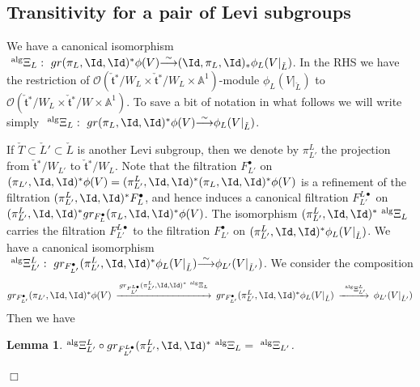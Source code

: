 \documentclass[11pt]{amsart}
\newtheorem{lem}{Lemma}
\theoremstyle{definition}
\theoremstyle{remark}
\renewcommand{\O}{{\mathcal O}}
\theoremstyle{remark}
\newcommand{\cal}{\mathcal}
\newcommand{\iso}{{\stackrel{\sim}{\longrightarrow}}}
\newcommand{\<}{\langle}
\renewcommand{\>}{\rangle}
\newcommand{\Lt}{\check{\mathfrak t}{}}
\newcommand{\LL}{\check{L}{}}
\newcommand{\LT}{\check{T}{}}
\renewcommand{\O}{{\cal O}}
\newcommand{\Aone}{{\mathbb A}^1}
\begin{document}
\subsection{Transitivity for a pair of Levi subgroups}
\label{algpair}
We have a canonical isomorphism
$\ ^{\operatorname{alg}}\Xi_L:\ gr(\pi_L,\Id,\Id)^*\phi(V)
\iso(\Id,\pi_L,\Id)_*\phi_L(V|_{\LL})$. 
In the RHS we have the restriction of 
$\O(\Lt^*/W_L\times\Lt^*/W_L\times\Aone)$-module $\phi_L(V|_{\LL})$ to
$\O(\Lt^*/W_L\times\Lt^*/W\times\Aone)$. To save a bit of notation in what 
follows we will write simply
$\ ^{\operatorname{alg}}\Xi_L:\ gr(\pi_L,\Id,\Id)^*\phi(V)\iso\phi_L(V|_{\LL})$.

If $\LT\subset\LL'\subset\LL$
is another Levi subgroup, then we denote by $\pi_{L'}^L$ the projection
from $\Lt^*/W_{L'}$ to $\Lt^*/W_L$. Note that the filtration $F_{L'}^\bullet$
on $(\pi_{L'},\Id,\Id)^*\phi(V)=
(\pi_{L'}^L,\Id,\Id)^*(\pi_L,\Id,\Id)^*\phi(V)$
is a refinement of the filtration $(\pi_{L'}^L,\Id,\Id)^*F_L^\bullet$,
and hence induces a canonical filtration $F_{L'}^{L\bullet}$ on
$(\pi_{L'}^L,\Id,\Id)^*gr_{F_L^\bullet}(\pi_L,\Id,\Id)^*
\phi(V)$. The isomorphism
$(\pi_{L'}^L,\Id,\Id)^*\ ^{\operatorname{alg}}\Xi_L$ carries the filtration $F_{L'}^{L\bullet}$
to the filtration $F_{L'}^\bullet$ on
$(\pi_{L'}^L,\Id,\Id)^*\phi_L(V|_{\LL})$.
We have a canonical isomorphism
$\ ^{\operatorname{alg}}\Xi_{L'}^L:\ gr_{F_{L'}^\bullet}(\pi_{L'}^L,\Id,\Id)^*
\phi_L(V|_{\LL})\iso\phi_{L'}(V|_{\LL'})$.
We consider the composition
\begin{equation}
\begin{CD} 
gr_{F_{L'}^\bullet}(\pi_{L'},\Id,\Id)^*\phi(V)
@>gr_{F_{L'}^{L\bullet}}(\pi_{L'}^L,\Id,\Id)^*\ ^{\operatorname{alg}}\Xi_L>>
gr_{F_{L'}^\bullet}(\pi_{L'}^L,\Id,\Id)^*
\phi_L(V|_{\LL})
@>\ ^{\operatorname{alg}}\Xi_{L'}^L>>
\phi_{L'}(V|_{\LL'})
\end{CD}
\end{equation}
Then we have
\begin{lem}
\label{ap}
$^{\operatorname{alg}}\Xi_{L'}^L\circ gr_{F_{L'}^{L\bullet}}
(\pi_{L'}^L,\Id,\Id)^*\ ^{\operatorname{alg}}\Xi_L=\ 
^{\operatorname{alg}}\Xi_{L'}$.
\end{lem}
\hfill $\Box$
\end{document}
